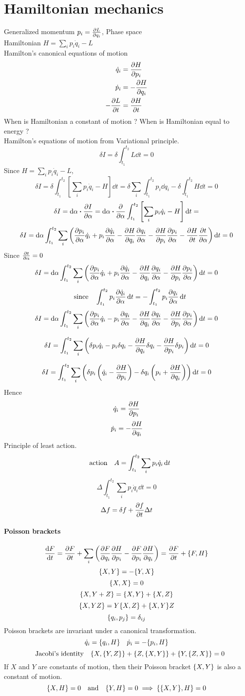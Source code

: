\documentclass[12pt]{article}
\begin{document}
\section*{Hamiltonian mechanics}
Generalized momentum $p_i=\pdv{L}{q_i}$, Phase space\\
Hamiltonian $H=\sum_ip_i\dot{q}_i-L$\\
Hamilton's canonical equations of motion
\begin{align*}
\dot{q}_i&=\pdv{H}{p_i}\\
\dot{p}_i&=-\pdv{H}{q_i}\\
-\pdv{L}{t}&=\pdv{H}{t}
\end{align*}
When is Hamiltonian a constant of motion ? When is Hamiltonian equal to energy ?\\
Hamilton's equations of motion from Variational principle.
\[\delta{I}=\delta\int_{t_1}^{t_2}L\dd{t}=0\]
Since $H=\sum_ip_i\dot{q}_i-L$,
\[\delta{I}=\delta\int_{t_1}^{t_2}\left[\sum_ip_i\dot{q}_i-H\right]\dd{t}=\delta\sum_i\int_{t_1}^{t_2}p_i\dd{q}_i-\delta\int_{t_1}^{t_2}H\dd{t}=0\]
\[\delta{I}=\dd{\alpha}\vdot\pdv{I}{\alpha}=\dd{\alpha}\vdot\pdv{\alpha}\int_{t_1}^{t_2}\left[\sum_ip_i\dot{q}_i-H\right]\dd{t}=\]
\[\delta{I}=\dd{\alpha}\int_{t_1}^{t_2}\sum_i\left(\pdv{p_i}{\alpha}\dot{q}_i+p_i\pdv{\dot{q}_i}{\alpha}-\pdv{H}{q_i}\pdv{q_i}{\alpha}-\pdv{H}{p_i}\pdv{p_i}{\alpha}-\pdv{H}{t}\pdv{t}{\alpha}\right)\dd{t}=0\]
Since $\pdv{t}{\alpha}=0$
\[\delta{I}=\dd{\alpha}\int_{t_1}^{t_2}\sum_i\left(\pdv{p_i}{\alpha}\dot{q}_i+p_i\pdv{\dot{q}_i}{\alpha}-\pdv{H}{q_i}\pdv{q_i}{\alpha}-\pdv{H}{p_i}\pdv{p_i}{\alpha}\right)\dd{t}=0\]
\[\qq{since}\int_{t_1}^{t_2}p_i\pdv{\dot{q}_i}{\alpha}\dd{t}=-\int_{t_1}^{t_2}p_i\pdv{q_i}{\alpha}\dd{t}\]
\[\delta{I}=\dd{\alpha}\int_{t_1}^{t_2}\sum_i\left(\pdv{p_i}{\alpha}\dot{q}_i-p_i\pdv{q_i}{\alpha}-\pdv{H}{q_i}\pdv{q_i}{\alpha}-\pdv{H}{p_i}\pdv{p_i}{\alpha}\right)\dd{t}=0\]

\[\delta{I}=\int_{t_1}^{t_2}\sum_i\left(\delta{p_i}\dot{q}_i-p_i\delta{q_i}-\pdv{H}{q_i}\delta{q_i}-\pdv{H}{p_i}\delta{p_i}\right)\dd{t}=0\]

\[\delta{I}=\int_{t_1}^{t_2}\sum_i\left(\delta{p_i}\left(\dot{q}_i-\pdv{H}{p_i}\right)-\delta{q_i}\left(p_i+\pdv{H}{q_i}\right)\right)\dd{t}=0\]
Hence
\[\dot{q}_i=\pdv{H}{p_i}\]
\[\dot{p}_i=-\pdv{H}{q_i}\] 
Principle of least action.
\[\qq{action} A=\int_{t_1}^{t_2}\sum_{i}p_i\dot{q}_i\dd{t}\]
\[\Delta\int_{t_1}^{t_2}\sum_{i}p_i\dot{q}_i\dd{t}=0\]
\[\Delta{f}=\delta{f}+\pdv{f}{t}\Delta{t}\]
\paragraph{Poisson brackets}
\[\dv{F}{t}=\pdv{F}{t}+\sum_{i}\qty(\pdv{F}{q_i}\pdv{H}{p_i}-\pdv{F}{p_i}\pdv{H}{q_i})=\pdv{F}{t}+\pb{F}{H}\]
\[\pb{X}{Y}=-\pb{Y}{X}\]
\[\pb{X}{X}=0\]
\[\pb{X}{Y+Z}=\pb{X}{Y}+\pb{X}{Z}\]
\[\pb{X}{YZ}=Y\pb{X}{Z}+\pb{X}{Y}Z\]
\[\pb{q_i}{p_j}=\delta_{ij}\]
Poisson brackets are invariant under a canonical transformation.\\
\[\dot{q}_i=\pb{q_i}{H}\quad\dot{p}_i=-\pb{p_i}{H}\]
\[\qq{Jacobi's identity}\pb{X}{\pb{Y}{Z}}+\pb{Z}{\pb{X}{Y}}+\pb{Y}{\pb{Z}{X}}=0\]
If $X$ and $Y$ are constants of motion, then their Poisson bracket $\pb{X}{Y}$ is also a constant of motion.
\[\pb{X}{H}=0\qq{and}\pb{Y}{H}=0\implies\pb{\pb{X}{Y}}{H}=0\]
\end{document}
